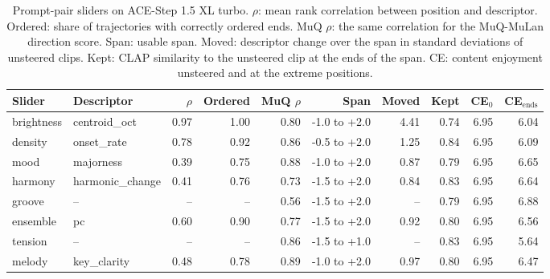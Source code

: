 \begin{table}[t]\centering\small
\begin{tabular}{llrrrrrrrr}
\toprule
Slider & Descriptor & $\rho$ & Ordered & MuQ $\rho$ & Span & Moved & Kept & CE$_0$ & CE$_\text{ends}$ \\
\midrule
brightness & centroid\_oct & 0.97 & 1.00 & 0.80 & -1.0 to +2.0 & 4.41 & 0.74 & 6.95 & 6.04 \\
density & onset\_rate & 0.78 & 0.92 & 0.86 & -0.5 to +2.0 & 1.25 & 0.84 & 6.95 & 6.09 \\
mood & majorness & 0.39 & 0.75 & 0.88 & -1.0 to +2.0 & 0.87 & 0.79 & 6.95 & 6.65 \\
harmony & harmonic\_change & 0.41 & 0.76 & 0.73 & -1.5 to +2.0 & 0.84 & 0.83 & 6.95 & 6.64 \\
groove & -- & -- & -- & 0.56 & -1.5 to +2.0 & -- & 0.79 & 6.95 & 6.88 \\
ensemble & pc & 0.60 & 0.90 & 0.77 & -1.5 to +2.0 & 0.92 & 0.80 & 6.95 & 6.56 \\
tension & -- & -- & -- & 0.86 & -1.5 to +1.0 & -- & 0.83 & 6.95 & 5.64 \\
melody & key\_clarity & 0.48 & 0.78 & 0.89 & -1.0 to +2.0 & 0.97 & 0.80 & 6.95 & 6.47 \\
\bottomrule
\end{tabular}
\caption{Prompt-pair sliders on ACE-Step 1.5 XL turbo. $\rho$: mean rank correlation between position and descriptor. Ordered: share of trajectories with correctly ordered ends. MuQ $\rho$: the same correlation for the MuQ-MuLan direction score. Span: usable span. Moved: descriptor change over the span in standard deviations of unsteered clips. Kept: CLAP similarity to the unsteered clip at the ends of the span. CE: content enjoyment unsteered and at the extreme positions.}\label{tab:ace}
\end{table}
